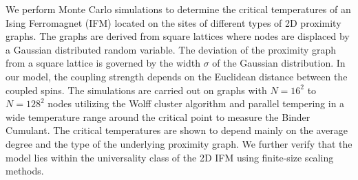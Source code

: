 We perform Monte Carlo simulations to determine the critical temperatures
of an Ising Ferromagnet (IFM) located on the sites of different types of
2D proximity graphs.
The graphs are derived from square lattices where nodes are displaced by
a Gaussian distributed random variable.
The deviation of the proximity graph from a square lattice is
governed by the width \(\sigma\) of the Gaussian distribution.
In our model, the coupling strength depends on the Euclidean distance
between the coupled spins.
The simulations are carried out on graphs with \(N=16^{2}\) to \(N=128^{2}\)
nodes utilizing the Wolff cluster algorithm and parallel tempering in a
wide temperature range around the critical point to measure the Binder Cumulant.
The critical temperatures are shown to depend mainly on the average degree
and the type of the underlying proximity graph.
We further verify that the model lies within the universality class of
the 2D IFM using finite-size scaling methods.
